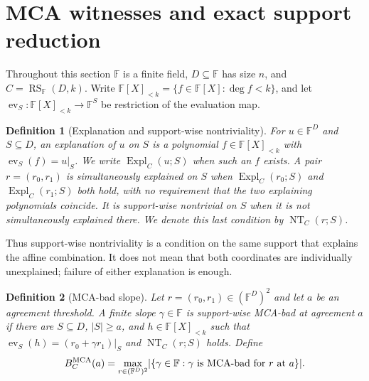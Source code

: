 \documentclass[11pt,a4paper]{amsart}
\numberwithin{equation}{section}
\newtheorem{definition}[definition]{Definition}
\theoremstyle{remark}
\DeclareMathOperator{\RS}{RS}
\newcommand{\F}{\mathbb F}
\newcommand{\abs}[1]{\lvert #1\rvert}
\begin{document}
\section{MCA witnesses and exact support reduction}\label{sec:witnesses}

Throughout this section \(\F\) is a finite field, \(D\subseteq\F\) has
size \(n\), and \(C=\RS_\F(D,k)\).  Write
\(\F[X]_{<k}=\{f\in\F[X]:\deg f<k\}\), and let
\(\operatorname{ev}_S:\F[X]_{<k}\to\F^S\) be restriction of the
evaluation map.

\begin{definition}[Explanation and support-wise nontriviality]
\label{def:explanation}
For \(u\in\F^D\) and \(S\subseteq D\), an \emph{explanation of \(u\) on
\(S\)} is a polynomial \(f\in\F[X]_{<k}\) with
\(\operatorname{ev}_S(f)=u|_S\).  We write
\(\operatorname{Expl}_C(u;S)\) when such an \(f\) exists.  A pair
\(r=(r_0,r_1)\) is \emph{simultaneously explained on \(S\)} when
\(\operatorname{Expl}_C(r_0;S)\) and
\(\operatorname{Expl}_C(r_1;S)\) both hold, with no requirement that the
two explaining polynomials coincide.  It is \emph{support-wise
nontrivial on \(S\)} when it is not simultaneously explained there.
We denote this last condition by \(\operatorname{NT}_C(r;S)\).
\end{definition}

Thus support-wise nontriviality is a condition on the same support that
explains the affine combination.  It does not mean that both coordinates
are individually unexplained; failure of either explanation is enough.

\begin{definition}[MCA-bad slope]\label{def:mca-bad}
Let \(r=(r_0,r_1)\in(\F^D)^2\) and let \(a\) be an agreement threshold.
A finite slope \(\gamma\in\F\) is support-wise MCA-bad at agreement \(a\)
if there are \(S\subseteq D\), \(\abs S\ge a\), and
\(h\in\F[X]_{<k}\) such that
\(\operatorname{ev}_S(h)=(r_0+\gamma r_1)|_S\) and
\(\operatorname{NT}_C(r;S)\) holds.  Define
\[
        B_C^{\rm MCA}(a)
        =\max_{r\in(\F^D)^2}\abs{\{\gamma\in\F:
          \gamma\text{ is MCA-bad for }r\text{ at }a\}}.
\]
\end{definition}
\end{document}
